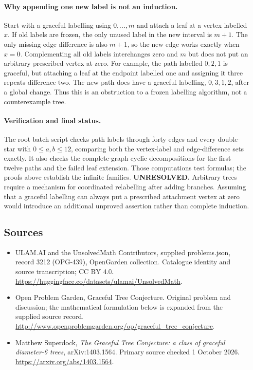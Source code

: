 \documentclass[11pt,a4paper]{article}
\begin{document}
\paragraph{Why appending one new label is not an induction.}
Start with a graceful labelling using $0,\ldots,m$ and attach a leaf at
a vertex labelled $x$. If old labels are frozen, the only unused label
in the new interval is $m+1$. The only missing edge difference is also
$m+1$, so the new edge works exactly when $x=0$. Complementing all old
labels interchanges zero and $m$ but does not put an arbitrary prescribed
vertex at zero. For example, the path labelled $0,2,1$ is graceful, but
attaching a leaf at the endpoint labelled one and assigning it three
repeats difference two. The new path does have a graceful labelling,
$0,3,1,2$, after a global change. Thus this is an obstruction to a frozen
labelling algorithm, not a counterexample tree.

\paragraph{Verification and final status.}
The root batch script checks path labels through forty edges and every
double-star with $0\le a,b\le12$, comparing both the vertex-label and
edge-difference sets exactly. It also checks the complete-graph cyclic
decompositions for the first twelve paths and the failed leaf extension.
Those computations test formulas; the proofs above establish the infinite
families. \textbf{UNRESOLVED.} Arbitrary trees require a mechanism for
coordinated relabelling after adding branches. Assuming that a graceful
labelling can always put a prescribed attachment vertex at zero would
introduce an additional unproved assertion rather than complete induction.

\subsection{Sources}
\begin{itemize}
\item[S1] ULAM.AI and the UnsolvedMath Contributors, supplied problems.json, record 3212 (OPG-439), OpenGarden collection. Catalogue identity and source transcription; CC BY 4.0.
\url{https://huggingface.co/datasets/ulamai/UnsolvedMath}.
\item[S2] Open Problem Garden, Graceful Tree Conjecture. Original problem and discussion; the mathematical formulation below is expanded from the supplied source record.
\url{http://www.openproblemgarden.org/op/graceful_tree_conjecture}.
\item[R1] Matthew Superdock, \emph{The Graceful Tree Conjecture:
a class of graceful diameter-6 trees}, arXiv:1403.1564.
Primary source checked 1 October 2026.
\url{https://arxiv.org/abs/1403.1564}.
\end{itemize}
\end{document}
